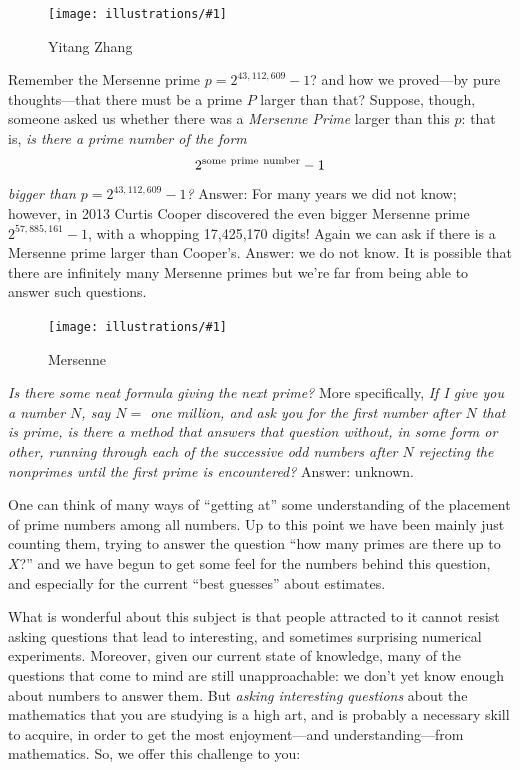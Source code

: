 \documentclass[openany]{book}
\newcommand{\ill}[3]{%
   \begin{figure}[H]%
   \vspace{-2ex}
   \centering%
   \texttt{[image: illustrations/\#1]}%
   \caption{#3}%
   \vspace{-2ex}
    \end{figure}}
\theoremstyle{plain}
\theoremstyle{definition}
\begin{document}
\ill{zhang}{0.25}{Yitang Zhang\label{fig:zhang}}



Remember the Mersenne prime $p= 2^{43,112,609}-1$? and how we
proved---by pure thoughts---that there must be
a prime $P$ larger than that? Suppose, though, someone
asked us whether there was a {\it Mersenne Prime} larger than this
$p$: that is, {\em is there a prime number of the form $$2^{\rm some\
  prime\ number}-1$$ bigger than $p= 2^{43,112,609}-1$?} Answer:
For many years we did not know; however, in 2013 Curtis Cooper discovered
the even bigger Mersenne prime $2^{57,885,161}-1$, with a whopping
17,425,170 digits!  Again we can ask if there is a Mersenne
prime larger than Cooper's.  Answer: we do not know.
It is possible that there are infinitely many Mersenne primes
but we're far from being able to answer such questions.

\ill{mersenne}{.3}{Mersenne}



{\em Is there some neat formula giving the next prime?} More
specifically, {\em If I give you a number $N$, say $N=$ one million,
  and ask you for the first number after $N$ that is prime, is there a
  method that answers that question without, in some form or other,
  running through each of the successive odd numbers after $N$ rejecting
  the nonprimes until the first prime is encountered?}  Answer:
unknown.



One can think of many ways of ``getting at'' some understanding of the
placement of prime numbers among all numbers.  Up to this point we have
been mainly just counting them, trying to answer the question ``how
many primes are there up to $X$?''  and we have begun to get some feel
for the numbers behind this question, and especially for the current
``best guesses'' about estimates.


What is wonderful about this subject is that people attracted to it
cannot resist asking questions that lead to interesting, and sometimes
surprising numerical experiments. Moreover, given our current state of
knowledge, many of the questions that come to mind are still
unapproachable: we don't yet know enough about numbers to answer them.
But {\it asking interesting questions} about the mathematics that you
are studying is a high art, and is probably a necessary skill to
acquire, in order to get the most enjoyment---and understanding---from
mathematics.  So, we offer this challenge to you:
\end{document}
